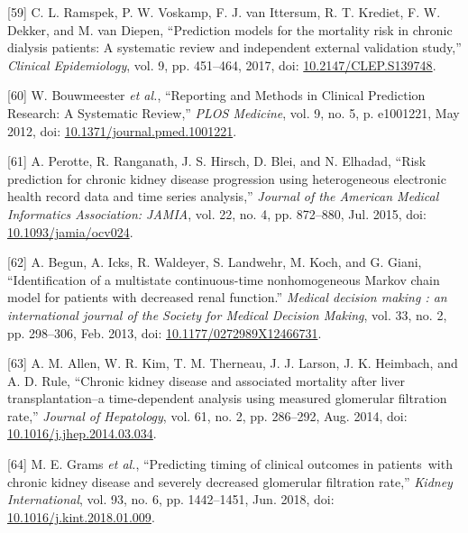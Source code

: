 \documentclass[12pt,PhD,twoside,openright]{muthesis}
\newenvironment{cslreferences}%
  {}%
  {\par}
\begin{document}
\begin{cslreferences}
\leavevmode\hypertarget{ref-ramspek_prediction_2017}{}%
{[}59{]} C. L. Ramspek, P. W. Voskamp, F. J. van Ittersum, R. T. Krediet, F. W. Dekker, and M. van Diepen, ``Prediction models for the mortality risk in chronic dialysis patients: A systematic review and independent external validation study,'' \emph{Clinical Epidemiology}, vol. 9, pp. 451--464, 2017, doi: \href{https://doi.org/10.2147/CLEP.S139748}{10.2147/CLEP.S139748}.

\leavevmode\hypertarget{ref-bouwmeester_reporting_2012-1}{}%
{[}60{]} W. Bouwmeester \emph{et al.}, ``Reporting and Methods in Clinical Prediction Research: A Systematic Review,'' \emph{PLOS Medicine}, vol. 9, no. 5, p. e1001221, May 2012, doi: \href{https://doi.org/10.1371/journal.pmed.1001221}{10.1371/journal.pmed.1001221}.

\leavevmode\hypertarget{ref-perotte_risk_2015}{}%
{[}61{]} A. Perotte, R. Ranganath, J. S. Hirsch, D. Blei, and N. Elhadad, ``Risk prediction for chronic kidney disease progression using heterogeneous electronic health record data and time series analysis,'' \emph{Journal of the American Medical Informatics Association: JAMIA}, vol. 22, no. 4, pp. 872--880, Jul. 2015, doi: \href{https://doi.org/10.1093/jamia/ocv024}{10.1093/jamia/ocv024}.

\leavevmode\hypertarget{ref-begun_identification_2013}{}%
{[}62{]} A. Begun, A. Icks, R. Waldeyer, S. Landwehr, M. Koch, and G. Giani, ``Identification of a multistate continuous-time nonhomogeneous Markov chain model for patients with decreased renal function.'' \emph{Medical decision making : an international journal of the Society for Medical Decision Making}, vol. 33, no. 2, pp. 298--306, Feb. 2013, doi: \href{https://doi.org/10.1177/0272989X12466731}{10.1177/0272989X12466731}.

\leavevmode\hypertarget{ref-allen_chronic_2014}{}%
{[}63{]} A. M. Allen, W. R. Kim, T. M. Therneau, J. J. Larson, J. K. Heimbach, and A. D. Rule, ``Chronic kidney disease and associated mortality after liver transplantation--a time-dependent analysis using measured glomerular filtration rate,'' \emph{Journal of Hepatology}, vol. 61, no. 2, pp. 286--292, Aug. 2014, doi: \href{https://doi.org/10.1016/j.jhep.2014.03.034}{10.1016/j.jhep.2014.03.034}.

\leavevmode\hypertarget{ref-grams_predicting_2018}{}%
{[}64{]} M. E. Grams \emph{et al.}, ``Predicting timing of clinical outcomes in patients~with chronic kidney disease and severely decreased glomerular filtration rate,'' \emph{Kidney International}, vol. 93, no. 6, pp. 1442--1451, Jun. 2018, doi: \href{https://doi.org/10.1016/j.kint.2018.01.009}{10.1016/j.kint.2018.01.009}.


\end{cslreferences}
\end{document}
